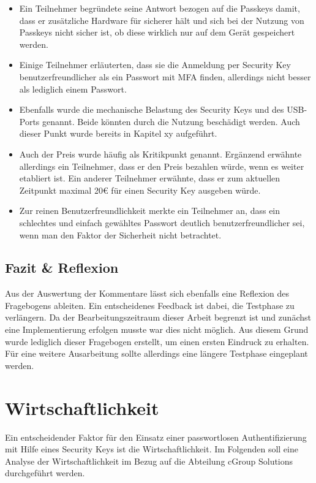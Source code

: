 \begin{itemize}
    \item Ein Teilnehmer begründete seine Antwort bezogen auf die Passkeys damit, dass er zusätzliche Hardware für sicherer hält und sich bei der Nutzung von Passkeys nicht sicher ist, ob diese wirklich nur auf dem Gerät gespeichert werden.
    \item Einige Teilnehmer erläuterten, dass sie die Anmeldung per Security Key benutzerfreundlicher als ein Passwort mit \ac{MFA} finden, allerdings nicht besser als lediglich einem Passwort.
    \item Ebenfalls wurde die mechanische Belastung des Security Keys und des USB-Ports genannt. Beide könnten durch die Nutzung beschädigt werden. Auch dieser Punkt wurde bereits in Kapitel xy aufgeführt.
    \item Auch der Preis wurde häufig als Kritikpunkt genannt. Ergänzend erwähnte allerdings ein Teilnehmer, dass er den Preis bezahlen würde, wenn es weiter etabliert ist. Ein anderer Teilnehmer erwähnte, dass er zum aktuellen Zeitpunkt maximal 20€ für einen Security Key ausgeben würde.
    \item Zur reinen Benutzerfreundlichkeit merkte ein Teilnehmer an, dass ein schlechtes und einfach gewähltes Passwort deutlich benutzerfreundlicher sei, wenn man den Faktor der Sicherheit nicht betrachtet.
\end{itemize}

\subsection{Fazit \& Reflexion}
Aus der Auswertung der Kommentare lässt sich ebenfalls eine Reflexion des Fragebogens ableiten. Ein entscheidenes Feedback ist dabei, die Testphase zu verlängern. Da der Bearbeitungszeitraum dieser Arbeit begrenzt ist und zunächst eine Implementierung erfolgen musste war dies nicht möglich. Aus diesem Grund wurde lediglich dieser Fragebogen erstellt, um einen ersten Eindruck zu erhalten. Für eine weitere Ausarbeitung sollte allerdings eine längere Testphase eingeplant werden. 


\section{Wirtschaftlichkeit}
Ein entscheidender Faktor für den Einsatz einer passwortlosen Authentifizierung mit Hilfe eines Security Keys ist die Wirtschaftlichkeit. Im Folgenden soll eine Analyse der Wirtschaftlichkeit im Bezug auf die Abteilung cGroup Solutions durchgeführt werden.

